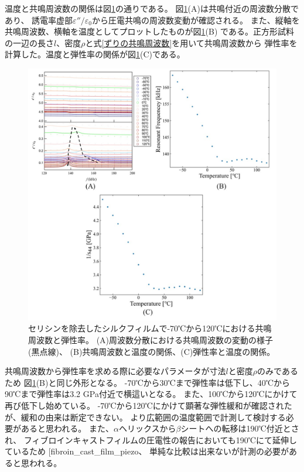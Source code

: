 \documentclass[dvipdfmx,12pt,a4paper]{jreport}
\makeatletter
\DeclareRobustCommand\cite{\unskip
    	\@ifnextchar[{\@tempswatrue\@citex}{\@tempswafalse\@citex[]}}
\makeatother
\begin{document}
			温度と共鳴周波数の関係は図\ref{温度_誘電率_セリシンなし_拡大像}の通りである。
			図\ref{温度_誘電率_セリシンなし_拡大像}(A)は共鳴付近の周波数分散であり、
			誘電率虚部$\varepsilon''/\varepsilon_0$から圧電共鳴の周波数変動が確認される。
			また、縦軸を共鳴周波数、横軸を温度としてプロットしたものが図\ref{温度_誘電率_セリシンなし_拡大像}(B)
			である。正方形試料の一辺の長さ$l$、密度$\rho$と式\eqref{ずりの共鳴周波数}を用いて共鳴周波数から
			弾性率を計算した。温度と弾性率の関係が図\ref{温度_誘電率_セリシンなし_拡大像}(C)である。
			\begin{figure}[H]
				\centering
				\includegraphics[width=\linewidth]{温度_誘電率_セリシンなし_拡大_2.jpg}
				\caption{セリシンを除去したシルクフィルムで-70℃から120℃における共鳴周波数と弾性率。
				(A)周波数分散における共鳴周波数の変動の様子(黒点線)、
				(B)共鳴周波数と温度の関係、(C)弾性率と温度の関係。}
				\label{温度_誘電率_セリシンなし_拡大像}
			\end{figure}
			\noindent
			共鳴周波数から弾性率を求める際に必要なパラメータが寸法$l$と密度$\rho$のみであるため
			図\ref{温度_誘電率_セリシンなし_拡大像}(B)と同じ外形となる。
			-70℃から30℃まで弾性率は低下し、40℃から90℃まで弾性率は3.2 GPa付近で横這いとなる。
			また、100℃から120℃にかけて再び低下し始めている。
			-70℃から120℃にかけて顕著な弾性緩和が確認されたが、緩和の由来は断定できない。
			より広範囲の温度範囲で計測して検討する必要があると思われる。
			また、$\alpha$ヘリックスから$\beta$シートへの転移は190℃付近とされ、
			フィブロインキャストフィルムの圧電性の報告においても190℃にて延伸しているため\cite{fibroin_cast_film_piezo}、
			単純な比較は出来ないが計測の必要があると思われる。
		
\end{document}

